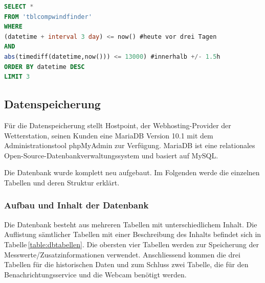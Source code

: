 \begin{lstlisting}[label=lst:viewForecast,caption=Erzeugung der VIEW für den Forecast-Vergleich, language=SQL, style=htmlcssjs]
SELECT *
FROM 'tblcompwindfinder'
WHERE
(datetime + interval 3 day) <= now() #heute vor drei Tagen
AND
abs(timediff(datetime,now())) <= 13000) #innerhalb +/- 1.5h
ORDER BY datetime DESC
LIMIT 3
\end{lstlisting}


\subsection{Datenspeicherung}
Für die Datenspeicherung stellt Hostpoint, der Webhosting-Provider der Wetterstation, seinen Kunden eine MariaDB Version 10.1 mit dem Administrationstool phpMyAdmin zur Verfügung. MariaDB ist eine relationales Open-Source-Datenbankverwaltungssystem und basiert auf MySQL.

Die Datenbank wurde komplett neu aufgebaut. Im Folgenden werde die einzelnen Tabellen und deren Struktur erklärt.


\subsubsection{Aufbau und Inhalt der Datenbank}
Die Datenbank besteht aus mehreren Tabellen mit unterschiedlichem Inhalt. Die Auflistung sämtlicher Tabellen mit einer Beschreibung des Inhalts befindet sich in Tabelle\,\ref{table:dbtabellen}. Die obersten vier Tabellen werden zur Speicherung der Messwerte/Zusatzinformationen verwendet. Anschliessend kommen die drei Tabellen für die historischen Daten und zum Schluss zwei Tabelle, die für den Benachrichtungsservice und die Webcam benötigt werden.

